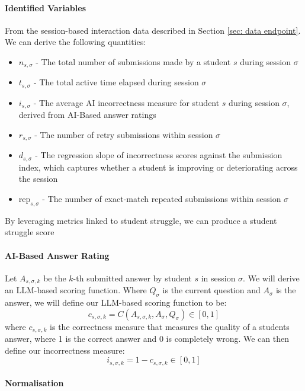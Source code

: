 \paragraph{Identified Variables}
From the session-based interaction data described in Section \ref{sec: data endpoint}. We can derive the following quantities:
\begin{itemize}
    \item $n_{s,\sigma}$ - The total number of submissions made by a student $s$ during session $\sigma$
    \item $t_{s,\sigma}$ - The total active time elapsed during session $\sigma$
    \item $i_{s,\sigma}$ - The average AI incorrectness measure for student $s$ during session $\sigma$, derived from AI-Based answer ratings
    \item $r_{s,\sigma}$ - The number of retry submissions within session $\sigma$
    \item $d_{s,\sigma}$ - The regression slope of incorrectness scores against the submission index, which captures whether a student is improving or deteriorating across the session
    \item $\mathrm{rep}_{s,\sigma}$ - The number of exact-match repeated submissions within session $\sigma$
\end{itemize}
By leveraging metrics linked to student struggle, we can produce a student struggle score

\paragraph{AI-Based Answer Rating}
Let $A_{s,\sigma,k}$ be the $k$-th submitted answer by student $s$ in session $\sigma$. We will derive an LLM-based scoring function. Where $Q_{\sigma}$ is the current question and $A_{\sigma}$ is the answer, we will define our LLM-based scoring function to be:
\begin{equation}
    c_{s,\sigma,k} = C(A_{s,\sigma,k},A_{\sigma},Q_{\sigma}) \in [0,1]
\end{equation}
where $c_{s,\sigma,k}$ is the correctness measure that measures the quality of a students answer, where 1 is the correct answer and 0 is completely wrong. We can then define our incorrectness measure:
\begin{equation}
    i_{s,\sigma,k} = 1 - c_{s,\sigma,k} \in [0,1]
\end{equation}

\paragraph{Normalisation}

